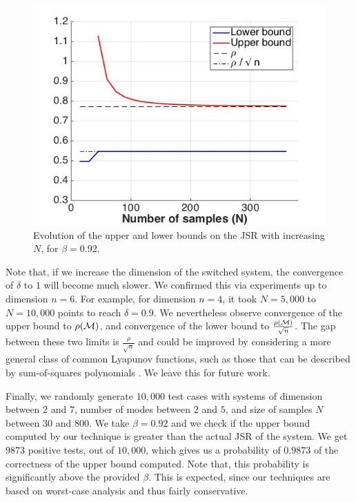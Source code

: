 \begin{figure}
\begin{center}
\includegraphics[trim = 5mm 5mm 5mm 5mm,scale=0.35]{bounds1.jpg}

\caption{Evolution of the upper and lower bounds on the JSR with increasing $N$, for $\beta=0.92$.}
\label{fig:21}
\end{center}
\end{figure}

Note that, if we increase the dimension of the switched system, the convergence of $\delta$ to $1$ will become much slower. We confirmed this via experiments up to dimension $n=6$. For example, for dimension $n=4$, it took $N=5,000$ to $N=10,000$ points to reach $\delta = 0.9$. We nevertheless observe convergence of the upper bound to $\rho(\mathcal{M})$, and convergence of the lower bound to $\frac{\rho(\mathcal{M})}{\sqrt{n}}$. The gap between these two limits is $\frac{\rho}{\sqrt{n}}$ and could be improved by considering a more general class of common Lyapunov functions, such as those that can be described by sum-of-squares polynomials \cite{sosLyap}. We leave this for future work.

Finally, we randomly generate $10,000$ test cases with systems of dimension between $2$ and $7$, number of modes between $2$ and $5$, and size of samples $N$ between $30$ and $800$. We take $\beta = 0.92$ and we check if the upper bound computed by our technique is greater than the actual JSR of the system. We get $9873$ positive tests, out of $10,000$, which gives us a probability of $0.9873$ of the correctness of the upper bound computed. Note that, this probability is significantly above the provided $\beta$. This is expected, since our techniques are based on worst-case analysis and thus fairly conservative.

